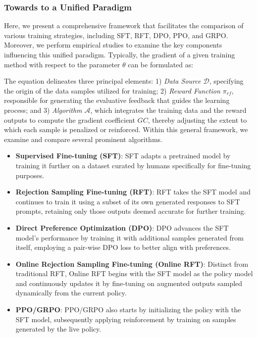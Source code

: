 \begin{itemize}[topsep=0pt]
\subsubsection{Towards to a Unified Paradigm} Here, we present a comprehensive framework that facilitates the comparison of various training strategies, including SFT, RFT, DPO, PPO, and GRPO. Moreover, we perform empirical studies to examine the key components influencing this unified paradigm. Typically, the gradient of a given training method with respect to the parameter $\theta$ can be formulated as:

The equation delineates three principal elements: 1) \textit{Data Source $\mathcal{D}$}, specifying the origin of the data samples utilized for training; 2) \textit{Reward Function $\pi_{{rf}}$}, responsible for generating the evaluative feedback that guides the learning process; and 3) \textit{Algorithm $\mathcal{A}$}, which integrates the training data and the reward outputs to compute the gradient coefficient $GC$, thereby adjusting the extent to which each sample is penalized or reinforced. Within this general framework, we examine and compare several prominent algorithms.

\begin{itemize}
    \item \textbf{Supervised Fine-tuning (SFT)}: SFT adapts a pretrained model by training it further on a dataset curated by humans specifically for fine-tuning purposes.
    \item \textbf{Rejection Sampling Fine-tuning (RFT)}: RFT takes the SFT model and continues to train it using a subset of its own generated responses to SFT prompts, retaining only those outputs deemed accurate for further training.
    \item \textbf{Direct Preference Optimization (DPO)}: DPO advances the SFT model's performance by training it with additional samples generated from itself, employing a pair-wise DPO loss to better align with preferences.
    \item \textbf{Online Rejection Sampling Fine-tuning (Online RFT)}: Distinct from traditional RFT, Online RFT begins with the SFT model as the policy model and continuously updates it by fine-tuning on augmented outputs sampled dynamically from the current policy.
    \item \textbf{PPO/GRPO}: PPO/GRPO also starts by initializing the policy with the SFT model, subsequently applying reinforcement by training on samples generated by the live policy.
\end{itemize}


\end{itemize}

